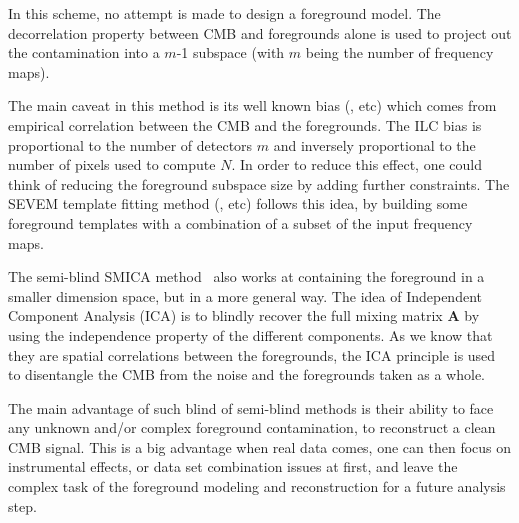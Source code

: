 \begin{itemize}
In this scheme, no attempt is made to design a foreground model. The decorrelation property between CMB and foregrounds alone is used to project out the contamination into a $m$-1 subspace (with $m$ being the number of frequency maps).

The main caveat in this method is its well known bias (\cite{hinshaw07, delabrouille09}, etc) which comes from empirical correlation between the CMB and the foregrounds. The ILC bias is proportional to the number of detectors $m$ and inversely proportional to the number of pixels used to compute $N$. In order to reduce this effect, one could think of reducing the foreground subspace size by adding further constraints. The SEVEM template fitting method (\cite{martinezgonzalez03}, etc) follows this idea, by building some foreground templates with a combination of a subset of the input frequency maps.

The semi-blind SMICA method~\cite{cardoso08} also works at containing the foreground in a smaller dimension space, but in a more general way. The idea of Independent Component Analysis (ICA) is to blindly recover the full mixing matrix $\mathbf{A}$ by using the independence property of the different components. As we know that they are spatial correlations between the foregrounds, the ICA principle is used to disentangle the CMB from the noise and the foregrounds taken as a whole.

The main advantage of such blind of semi-blind methods is their ability to face any unknown and/or complex foreground contamination, to reconstruct a clean CMB signal. This is a big advantage when real data comes, one can then focus on instrumental effects, or data set combination issues at first, and leave the complex task of the foreground modeling and reconstruction for a future analysis step.


\end{itemize}

